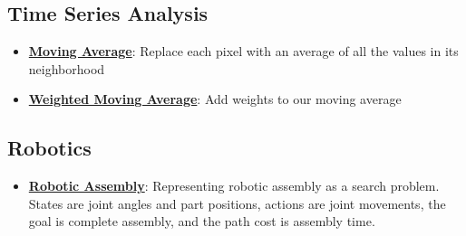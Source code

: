 \documentclass{article}%
\begin{document}
%
\subsection{Time Series Analysis}%
\label{subsec:TimeSeriesAnalysis}%
\begin{itemize}[leftmargin=*]%
\item \href{https://purdue.brightspace.com/d2l/common/assets/pdfjs-d2l-dist/1.0.14-legacy/web/viewer.html?file=\%2Fcontent\%2Fenforced\%2F1095467-wl.202510.CS.24300.001\%2F07L2-Vision.pdf\%3Fou\%3D1095467\&lang=en-us\&container=d2l-fileviewer-rendered-pdf\&fullscreen=d2l-fileviewer-rendered-pdf-dialog\&height=667#page=38}{\textbf{Moving Average}}: Replace each pixel with an average of all the values in its neighborhood%
\item \href{https://purdue.brightspace.com/d2l/common/assets/pdfjs-d2l-dist/1.0.14-legacy/web/viewer.html?file=\%2Fcontent\%2Fenforced\%2F1095467-wl.202510.CS.24300.001\%2F07L2-Vision.pdf\%3Fou\%3D1095467\&lang=en-us\&container=d2l-fileviewer-rendered-pdf\&fullscreen=d2l-fileviewer-rendered-pdf-dialog\&height=667#page=40}{\textbf{Weighted Moving Average}}: Add weights to our moving average%
\end{itemize}

%
\subsection{Robotics}%
\label{subsec:Robotics}%
\begin{itemize}[leftmargin=*]%
\item \href{https://purdue.brightspace.com/d2l/common/assets/pdfjs-d2l-dist/1.0.14-legacy/web/viewer.html?file=\%2Fcontent\%2Fenforced\%2F1095467-wl.202510.CS.24300.001\%2F14L1-DepthFS.pdf\%3Fou\%3D1095467\&lang=en-us\&container=d2l-fileviewer-rendered-pdf\&fullscreen=d2l-fileviewer-rendered-pdf-dialog\&height=667#page=33}{\textbf{Robotic Assembly}}: Representing robotic assembly as a search problem. States are joint angles and part positions, actions are joint movements, the goal is complete assembly, and the path cost is assembly time.%
\end{itemize}

%
\end{document}
